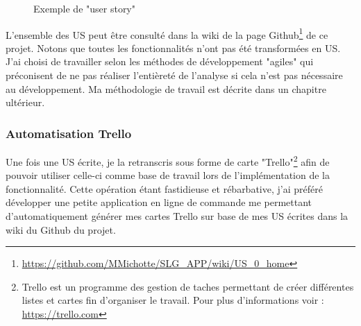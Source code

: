 \begin{figure}[H]
  \centering
  \caption{Exemple de "user story"}
\end{figure}

L'ensemble des US peut être consulté dans la wiki de la page Github\footnote{\url {https://github.com/MMichotte/SLG_APP/wiki/US_0_home}} de ce projet. 
Notons que toutes les fonctionnalités n'ont pas été transformées en US. J'ai choisi de travailler selon les méthodes de développement "agiles" qui préconisent de ne pas réaliser l'entièreté de l'analyse si cela n'est pas nécessaire au développement. Ma méthodologie de travail est décrite dans un chapitre ultérieur. 

\newpage

\subsubsection{Automatisation Trello}
Une fois une US écrite, je la retranscris sous forme de carte "Trello"\footnote{Trello est un programme des gestion de taches permettant de créer différentes listes et cartes fin d'organiser le travail. Pour plus d'informations voir : \url{https://trello.com}} afin de pouvoir utiliser celle-ci comme base de travail lors de l'implémentation de la fonctionnalité. Cette opération étant fastidieuse et rébarbative, j'ai préféré développer une petite application en ligne de commande me permettant d'automatiquement générer mes cartes Trello sur base de mes US écrites dans la wiki du Github du projet. 

